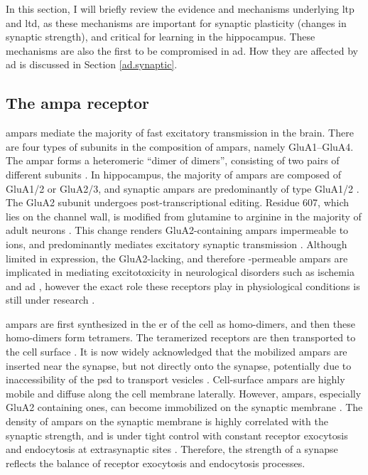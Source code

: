 In this section, I will briefly review the evidence and mechanisms underlying \gls{ltp} and \gls{ltd}, as these mechanisms are important for synaptic plasticity (changes in synaptic strength), and critical for learning in the hippocampus. These mechanisms are also the first to be compromised in \gls{ad}. How they are affected by \gls{ad} is discussed in Section \ref{ad.synaptic}. 

\subsection{The \gls{ampa} receptor}

\glspl{ampar} mediate the majority of fast excitatory transmission in the brain. There are four types of subunits in the composition of \glspl{ampar}, namely GluA1--GluA4. The \gls{ampar} forms a heteromeric ``dimer of dimers'', consisting of two pairs of different subunits \citep{ayalon01}. In hippocampus, the majority of \glspl{ampar} are composed of GluA1/2 or GluA2/3, and synaptic \glspl{ampar} are predominantly of type GluA1/2 \citep{wenthold96, lu09}. The GluA2 subunit undergoes post-transcriptional editing. Residue 607, which lies on the channel wall, is modified from glutamine to arginine in the majority of adult neurons \citep{greger03}. This change renders GluA2-containing \gls{ampar}s impermeable to  ions, and predominantly mediates excitatory synaptic transmission \citep{sommer91,swanson97}. Although limited in expression, the GluA2-lacking, and therefore -permeable \glspl{ampar} are implicated in mediating excitotoxicity in neurological disorders such as ischemia and \gls{ad} \citep{kwak06, whitehead17}, however the exact role these receptors play in physiological conditions is still under research \citep{whitehead17}.

\Glspl{ampar} are first synthesized in the \gls{er} of the cell as homo-dimers, and then these homo-dimers form tetramers. The teramerized receptors are then transported to the cell surface \citep{henley13}. It is now widely acknowledged that the mobilized \glspl{ampar} are inserted near the synapse, but not directly onto the synapse, potentially due to inaccessibility of the \gls{psd} to transport vesicles \citep{henley11, chater14}. Cell-surface \glspl{ampar} are highly mobile and diffuse along the cell membrane laterally. However, \glspl{ampar}, especially GluA2 containing ones, can become immobilized on the synaptic membrane \citep{borgdorff02, groc04}. The density of \glspl{ampar} on the synaptic membrane is highly correlated with the synaptic strength, and is under tight control with constant receptor exocytosis and endocytosis at extrasynaptic sites \citep{malinow02, henley11}. Therefore, the strength of a synapse reflects the balance of receptor exocytosis and endocytosis processes. 

